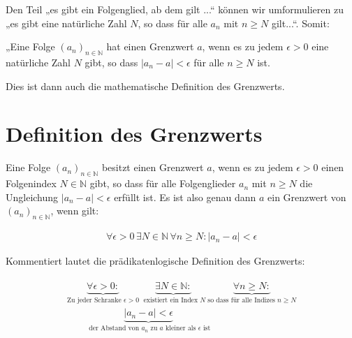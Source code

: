 \documentclass[fontsize=9pt,
               parskip=half-,
               DIV=14,
               listof=chapterentry,
               tocflat]{scrbook}
\begin{document}
Den Teil „es gibt ein Folgenglied, ab dem gilt ...“ können wir umformulieren zu „es gibt eine natürliche Zahl $N$, so dass für alle $a_{n}$ mit $n\geq N$ gilt...“. Somit:

\begin{importantparagraph*}
„Eine Folge $\left(a_{n}\right)_{n\in \mathbb {N} }$ hat einen Grenzwert $a$, wenn es zu jedem $\epsilon >0$ eine natürliche Zahl $N$ gibt, so dass $|a_{n}-a|<\epsilon $ für alle $n\geq N$ ist.

\end{importantparagraph*}

Dies ist dann auch die mathematische Definition des Grenzwerts.

\section{Definition des Grenzwerts}

\begin{definition*}[Grenzwert]
Eine Folge $\left(a_{n}\right)_{n\in \mathbb {N} }$ besitzt einen Grenzwert $a$, wenn es zu jedem $\epsilon >0$ einen Folgenindex $N\in \mathbb {N} $ gibt, so dass für alle Folgenglieder $a_{n}$ mit $n\geq N$ die Ungleichung $|a_{n}-a|<\epsilon $ erfüllt ist. Es ist also genau dann $a$ ein Grenzwert von $\left(a_{n}\right)_{n\in \mathbb {N} }$, wenn gilt:

\begin{align*}
\forall \epsilon >0\,\exists N\in \mathbb {N} \,\forall n\geq N:|a_{n}-a|<\epsilon 
\end{align*}

\end{definition*}

Kommentiert lautet die prädikatenlogische Definition des Grenzwerts:

\begin{align*}
{\begin{array}{l}\underbrace {{\underset {}{}}\forall \epsilon >0:} _{{\text{Zu jeder Schranke }}\epsilon >0}\ \underbrace {{\underset {}{}}\exists N\in \mathbb {N} :} _{{\text{ existiert ein Index }}N}\ \underbrace {{\underset {}{}}\forall n\geq N:} _{{\text{so dass für alle Indizes }}n\geq N}\\[1em]\quad \quad \underbrace {{\underset {}{}}|a_{n}-a|<\epsilon } _{{\text{ der Abstand von }}a_{n}{\text{ zu }}a{\text{ kleiner als }}\epsilon {\text{ ist}}}\end{array}}
\end{align*}
\end{document}
